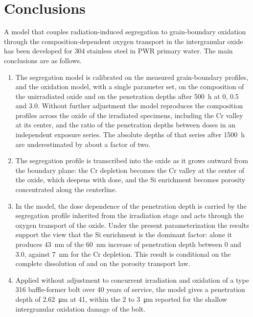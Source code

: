 \documentclass[3p,times,nonatbib]{elsarticle} %
\begin{document}
\section{Conclusions}
\label{sec:conclusion}

A model that couples radiation-induced segregation to grain-boundary
oxidation through the composition-dependent oxygen transport in the
intergranular oxide has been developed for 304 stainless steel in PWR primary
water. The main conclusions are as follows.

\begin{enumerate}
\item The segregation model is calibrated on the measured grain-boundary
profiles, and the oxidation model, with a single parameter set, on the
composition of the unirradiated oxide and on the penetration depths after
\SI{500}{h} at 0, 0.5 and \SI{3.0}{\dpa}. Without further adjustment the
model reproduces the composition profiles across the oxide of the irradiated
specimens, including the Cr valley at its center, and the ratio of the
penetration depths between doses in an independent exposure series. The
absolute depths of that series after \SI{1500}{h} are underestimated by
about a factor of two.

\item The segregation profile is transcribed into the oxide as it grows
outward from the boundary plane: the Cr depletion becomes the Cr valley at
the center of the oxide, which deepens with dose, and the Si enrichment
becomes porosity concentrated along the centerline.

\item In the model, the dose dependence of the penetration depth is carried
by the segregation profile inherited from the irradiation stage and acts
through the oxygen transport of the oxide. Under the present
parameterization the results support the view that the Si enrichment is the
dominant factor: alone it produces \SI{43}{nm} of the \SI{60}{nm} increase
of penetration depth between 0 and \SI{3.0}{\dpa}, against \SI{7}{nm} for
the Cr depletion. This result is conditional on the complete dissolution of
 and on the porosity transport law.

\item Applied without adjustment to concurrent irradiation and oxidation of
a type 316 baffle-former bolt over 40 years of service, the model gives a
penetration depth of \SI{2.62}{\micro\metre} at \SI{41}{\dpa}, within the 2
to \SI{3}{\micro\metre} reported for the shallow intergranular oxidation
damage of the bolt.
\end{enumerate}

\printbibliography
\end{document}
